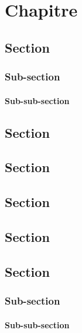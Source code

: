 \documentclass[twoside,titlepage,paper=a4,fontsize=12pt,numbers=noenddot,cleardoublepage=empty,BCOR=5mm,openright]{scrreprt}
\begin{document}
\chapter{Chapitre}

\section{Section}
\subsection{Sub-section}
\subsubsection{Sub-sub-section}

\section{Section}
\section{Section}
\section{Section}
\section{Section}
\section{Section}
\subsection{Sub-section}
\subsubsection{Sub-sub-section}

\appendix

\cleardoublepage %
\end{document}
